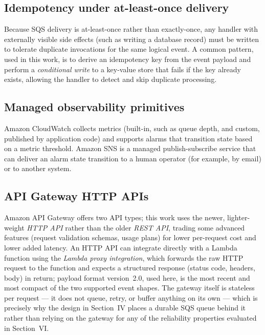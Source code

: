 \documentclass[conference]{IEEEtran}
\begin{document}
\subsection{Idempotency under at-least-once delivery}
Because SQS delivery is at-least-once rather than exactly-once, any handler with externally visible side effects (such as writing a database record) must be written to tolerate duplicate invocations for the same logical event. A common pattern, used in this work, is to derive an idempotency key from the event payload and perform a \emph{conditional write} to a key-value store that fails if the key already exists, allowing the handler to detect and skip duplicate processing.

\subsection{Managed observability primitives}
Amazon CloudWatch collects metrics (built-in, such as queue depth, and custom, published by application code) and supports alarms that transition state based on a metric threshold. Amazon SNS is a managed publish-subscribe service that can deliver an alarm state transition to a human operator (for example, by email) or to another system.

\subsection{API Gateway HTTP APIs}
Amazon API Gateway offers two API types; this work uses the newer, lighter-weight \emph{HTTP API} rather than the older \emph{REST API}, trading some advanced features (request validation schemas, usage plans) for lower per-request cost and lower added latency. An HTTP API can integrate directly with a Lambda function using the \emph{Lambda proxy integration}, which forwards the raw HTTP request to the function and expects a structured response (status code, headers, body) in return; payload format version~2.0, used here, is the most recent and most compact of the two supported event shapes. The gateway itself is stateless per request --- it does not queue, retry, or buffer anything on its own --- which is precisely why the design in Section~IV places a durable SQS queue behind it rather than relying on the gateway for any of the reliability properties evaluated in Section~VI.
\end{document}
